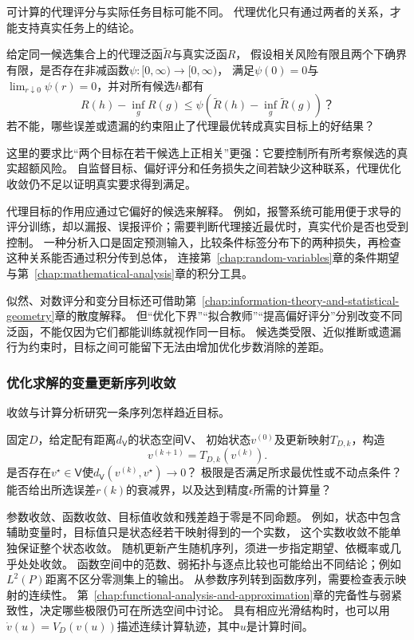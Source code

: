 可计算的代理评分与实际任务目标可能不同。
代理优化只有通过两者的关系，才能支持真实任务上的结论。

\begin{mathproblem}[代理泛函能否支持真实目标]
  \label{question:future-proxy-risk}
  给定同一候选集合上的代理泛函$\widetilde R$与真实泛函$R$，
  假设相关风险有限且两个下确界有限，是否存在非减函数$\psi:[0,\infty)\to[0,\infty)$，
  满足$\psi(0)=0$与$\lim_{r\downarrow0}\psi(r)=0$，并对所有候选$h$都有
  \[
    R(h)-\inf_gR(g)
    \leq\psi\!\left(\widetilde R(h)-\inf_g\widetilde R(g)\right)\text{？}
  \]
  若不能，哪些误差或遗漏的约束阻止了代理最优转成真实目标上的好结果？
\end{mathproblem}

这里的要求比“两个目标在若干候选上正相关”更强：它要控制所有所考察候选的真实超额风险。
自监督目标、偏好评分和任务损失之间若缺少这种联系，代理优化收敛仍不足以证明真实要求得到满足。

代理目标的作用应通过它偏好的候选来解释。
例如，报警系统可能用便于求导的评分训练，却以漏报、误报评价；需要判断代理接近最优时，真实代价是否也受到控制。
一种分析入口是固定预测输入，比较条件标签分布下的两种损失，再检查这种关系能否通过积分传到总体，
连接第~\ref{chap:random-variables}章的条件期望与第~\ref{chap:mathematical-analysis}章的积分工具。

似然、对数评分和变分目标还可借助第~\ref{chap:information-theory-and-statistical-geometry}章的散度解释。
但“优化下界”“拟合教师”“提高偏好评分”分别改变不同泛函，不能仅因为它们都能训练就视作同一目标。
候选类受限、近似推断或遗漏行为约束时，目标之间可能留下无法由增加优化步数消除的差距。

\subsubsection{优化求解的变量更新序列收敛}
\label{sec:future-analysis-convergence}

收敛与计算分析研究一条序列怎样趋近目标。

\begin{mathproblem}[训练序列的极限与速度]
  \label{question:future-convergence}
  固定$D$，给定配有距离$d_{\mathsf V}$的状态空间$\mathsf V$、
  初始状态$v^{(0)}$及更新映射$T_{D,k}$，构造
  \[
    v^{(k+1)}=T_{D,k}(v^{(k)}).
  \]
  是否存在$v^\star\in\mathsf V$使$d_{\mathsf V}(v^{(k)},v^\star)\to0$？
  极限是否满足所求最优性或不动点条件？
  能否给出所选误差$r(k)$的衰减界，以及达到精度$\epsilon$所需的计算量？
\end{mathproblem}

参数收敛、函数收敛、目标值收敛和残差趋于零是不同命题。
例如，状态中包含辅助变量时，目标值只是状态经若干映射得到的一个实数，
这个实数收敛不能单独保证整个状态收敛。
随机更新产生随机序列，须进一步指定期望、依概率或几乎处处收敛。
函数空间中的范数、弱拓扑与逐点比较也可能给出不同结论；例如$L^2(P)$距离不区分零测集上的输出。
从参数序列转到函数序列，需要检查表示映射的连续性。
第~\ref{chap:functional-analysis-and-approximation}章的完备性与弱紧致性，决定哪些极限仍可在所选空间中讨论。
具有相应光滑结构时，也可以用$\dot v(u)=V_D(v(u))$描述连续计算轨迹，其中$u$是计算时间。

